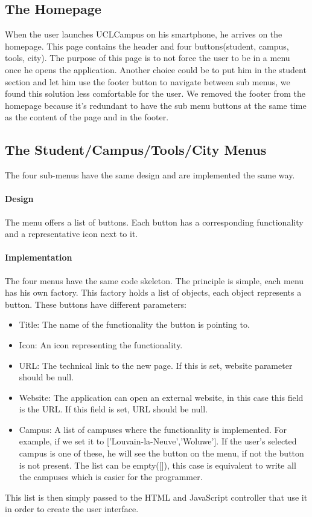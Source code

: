 \documentclass{eplmastersthesis}
\begin{document}
\subsection{The Homepage}
When the user launches UCLCampus on his smartphone, he arrives on the homepage. This page contains the header and four buttons(student, campus, tools, city). The purpose of this page is to not force the user to be in a menu once he opens the application. Another choice could be to put him in the student section and let him use the footer button to navigate between sub menus, we found this solution less comfortable for the user. We removed the footer from the homepage because it's redundant to have the sub menu buttons at the same time as the content of the page and in the footer.
\subsection{The Student/Campus/Tools/City Menus}
The four sub-menus have the same design and are implemented the same way.
\paragraph{Design}
The menu offers a list of buttons. Each button has a corresponding functionality and a representative icon next to it.
\paragraph{Implementation}
The four menus have the same code skeleton. The principle is simple, each menu has his own factory. This factory holds a list of objects, each object represents a button. These buttons have different parameters: 
\begin{itemize}
\item Title: The name of the functionality the button is pointing to.
\item Icon: An icon representing the functionality.
\item URL: The technical link to the new page. If this is set, website parameter should be null.
\item Website: The application can open an external website, in this case this field is the URL. If this field is set, URL should be null.
\item Campus: A list of campuses where the functionality is implemented. For example, if we set it to ['Louvain-la-Neuve','Woluwe']. If the user's selected campus is one of these, he will see the button on the menu, if not the button is not present. The list can be empty([]), this case is equivalent to write all the campuses which is easier for the programmer. 
\end{itemize}
This list is then simply passed to the HTML and JavaScript controller that use it in order to create the user interface.
\end{document}
